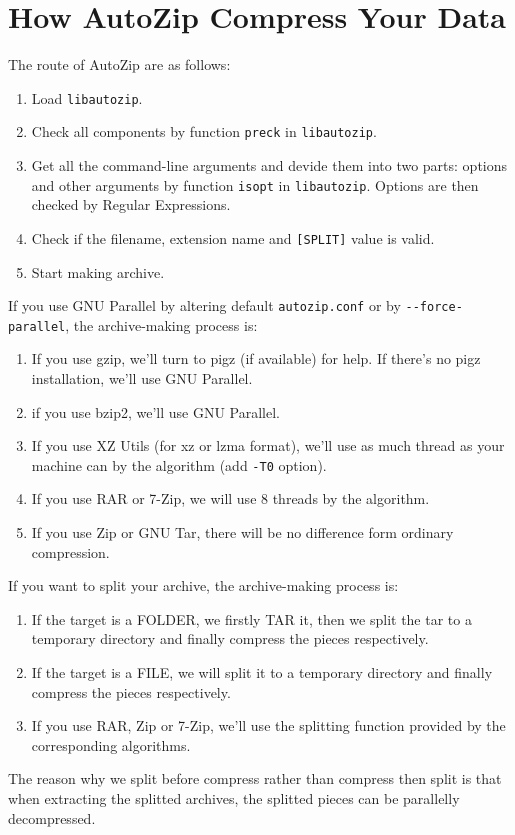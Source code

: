 \documentclass[fleqn,10pt]{SelfArx} %
\begin{document}
\section{How AutoZip Compress Your Data}
The route of AutoZip are as follows:
\begin{enumerate}
\item Load \verb|libautozip|.
\item Check all components by function \verb|preck| in \verb|libautozip|.
\item Get all the command-line arguments and devide them into two parts: options and other arguments by function \verb|isopt| in \verb|libautozip|. Options are then checked by Regular Expressions.
\item Check if the filename, extension name and \verb|[SPLIT]| value is valid.
\item Start making archive.
\end{enumerate}
If you use GNU Parallel by altering default \verb|autozip.conf| or by \verb|--force-parallel|, the archive-making process is:
\begin{enumerate}
\item If you use gzip, we'll turn to pigz (if available) for help. If there's no pigz installation, we'll use GNU Parallel.
\item if you use bzip2, we'll use GNU Parallel.
\item If you use XZ Utils (for xz or lzma format), we'll use as much thread as your machine can by the algorithm (add \verb|-T0| option).
\item If you use RAR or 7-Zip, we will use 8 threads by the algorithm.
\item If you use Zip or GNU Tar, there will be no difference form ordinary compression.
\end{enumerate}
If you want to split your archive, the archive-making process is:
\begin{enumerate}
\item If the target is a FOLDER, we firstly TAR it, then we split the tar to a temporary directory and finally compress the pieces respectively.
\item If the target is a FILE, we will split it to a temporary directory and finally compress the pieces respectively.
\item If you use RAR, Zip or 7-Zip, we'll use the splitting function provided by the corresponding algorithms.
\end{enumerate}
The reason why we split before compress rather than compress then split is that when extracting the splitted archives, the splitted pieces can be parallelly decompressed.
\end{document}
